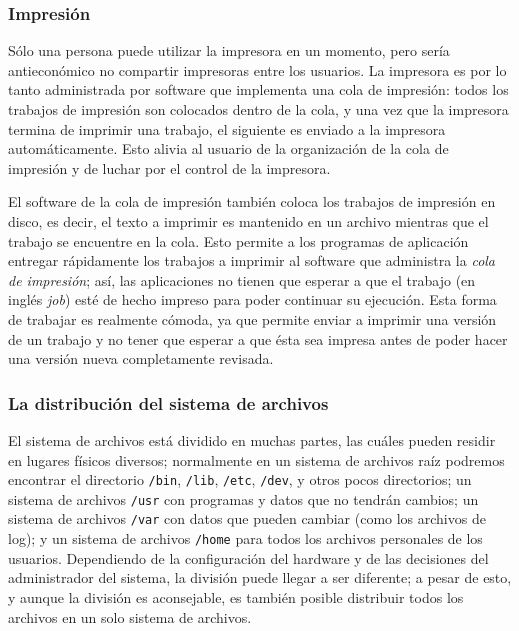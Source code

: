 \documentclass[12pt]{article}
\begin{document}
\subsubsection{Impresión}

 Sólo una persona puede utilizar la impresora en un momento, pero
sería antieconómico no compartir impresoras entre los usuarios. La impresora es
por lo tanto administrada por software que implementa una cola de impresión:
todos los trabajos de impresión son colocados dentro de la cola, y una vez que
la impresora termina de imprimir una trabajo, el siguiente es enviado a la
impresora automáticamente. Esto alivia al usuario de la organización de la cola
de impresión y de luchar por el control de la impresora.  

 El software de la cola de impresión también coloca los trabajos de
impresión en disco, es decir, el texto a imprimir es mantenido en un archivo
mientras que el trabajo se encuentre en la cola. Esto permite a los programas de
aplicación entregar rápidamente los trabajos a imprimir al software que
administra la \textit{cola de impresión}; así, las aplicaciones no
tienen que esperar a que el trabajo (en inglés \textit{job}) esté de hecho impreso para
poder continuar su ejecución. Esta forma de trabajar es realmente cómoda, ya que
permite enviar a imprimir una versión de un trabajo y no tener que esperar a que
ésta sea impresa antes de poder hacer una versión nueva completamente revisada.




\subsubsection{ La distribución del sistema de archivos}



 El sistema de archivos está dividido en muchas partes, las cuáles pueden residir
en lugares físicos diversos; normalmente en un sistema de archivos raíz podremos 
encontrar el directorio \texttt{/bin}, \texttt{/lib}, \texttt{/etc}, \texttt{/dev},
y otros pocos directorios; un sistema de archivos \texttt{/usr} con programas y datos que
no tendrán cambios; un sistema de archivos \texttt{/var} con datos que pueden cambiar
(como los archivos de log); y un sistema de archivos \texttt{/home}
para todos los archivos personales de los usuarios. Dependiendo de la
configuración del hardware y de las decisiones del administrador del sistema, la
división puede llegar a ser diferente; a pesar de esto, y aunque la división es
aconsejable, es también posible distribuir todos los archivos en un solo sistema
de archivos.  
\end{document}
